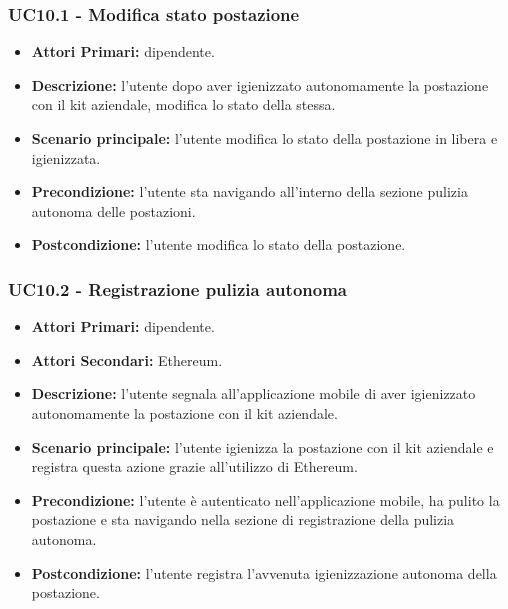 \subsubsection{ UC10.1 - Modifica stato postazione }
\begin{itemize}
	\item\textbf{Attori Primari:} dipendente.
	\item\textbf{Descrizione:} l’utente dopo aver igienizzato autonomamente la postazione con il kit aziendale, modifica lo stato della stessa.
	\item\textbf{Scenario principale:} l’utente modifica lo stato della postazione in libera e igienizzata.
	\item\textbf{Precondizione:} l’utente sta navigando all'interno della sezione pulizia autonoma delle postazioni.
	\item\textbf{Postcondizione:} l’utente modifica lo stato della postazione.
\end{itemize}

\subsubsection{ UC10.2 - Registrazione pulizia autonoma }
\begin{itemize}
           	\item\textbf{Attori Primari:} dipendente.
           	\item\textbf{Attori Secondari:} Ethereum.
           	\item\textbf{Descrizione:} l’utente segnala all'applicazione mobile di aver igienizzato autonomamente la postazione con il kit aziendale.
           	\item\textbf{Scenario principale:} l’utente igienizza la postazione con il kit aziendale e registra questa azione grazie all'utilizzo di Ethereum.
           	\item\textbf{Precondizione:} l’utente è autenticato nell'applicazione mobile, ha pulito la postazione e sta navigando nella sezione di 
           	registrazione della pulizia autonoma.
           	\item\textbf{Postcondizione:} l’utente registra l'avvenuta igienizzazione autonoma della postazione.
\end{itemize}
